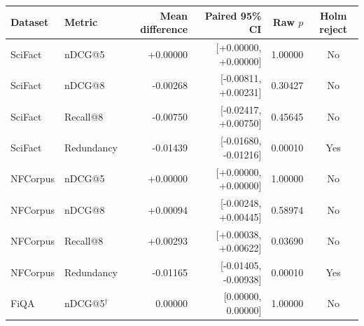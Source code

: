 \begin{tabular}{llrrrc}
\toprule
Dataset & Metric & Mean difference & Paired 95\% CI & Raw $p$ & Holm reject\\
\midrule
SciFact & nDCG@5 & +0.00000 & [+0.00000, +0.00000] & 1.00000 & No\\
SciFact & nDCG@8 & -0.00268 & [-0.00811, +0.00231] & 0.30427 & No\\
SciFact & Recall@8 & -0.00750 & [-0.02417, +0.00750] & 0.45645 & No\\
SciFact & Redundancy & -0.01439 & [-0.01680, -0.01216] & 0.00010 & Yes\\
NFCorpus & nDCG@5 & +0.00000 & [+0.00000, +0.00000] & 1.00000 & No\\
NFCorpus & nDCG@8 & +0.00094 & [-0.00248, +0.00445] & 0.58974 & No\\
NFCorpus & Recall@8 & +0.00293 & [+0.00038, +0.00622] & 0.03690 & No\\
NFCorpus & Redundancy & -0.01165 & [-0.01405, -0.00938] & 0.00010 & Yes\\
FiQA & nDCG@5$^\dagger$ & 0.00000 & [0.00000, 0.00000] & 1.00000 & No\\
\bottomrule
\end{tabular}
